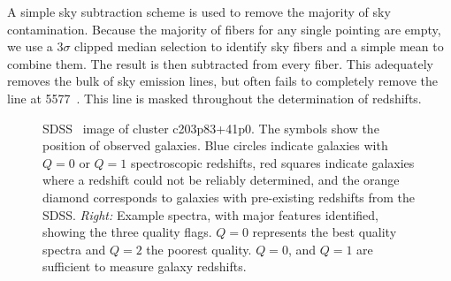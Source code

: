 A simple sky subtraction scheme is used to remove the majority of sky contamination. Because the majority of fibers for any single pointing are empty, we use a $3\sigma$ clipped median selection to identify sky fibers and a simple mean to combine them. The result is then subtracted from every fiber. This adequately removes the bulk of sky emission lines, but often fails to completely remove the \hbox{} line at 5577~\AAA. This line is masked throughout the determination of redshifts.

\begin{figure}[t]
\hfill
{}
    \caption{SDSS \sdssr\ image of cluster c203p83+41p0. The symbols show the position of observed galaxies. Blue circles indicate galaxies with $Q=0$ or $Q=1$ spectroscopic redshifts, red squares indicate galaxies where a redshift could not be reliably determined, and the orange diamond corresponds to galaxies with pre-existing redshifts from the SDSS. \textit{Right:} Example spectra, with major features identified, showing the three quality flags. $Q=0$ represents the best quality spectra and $Q=2$ the poorest quality. $Q=0$, and $Q=1$ are sufficient to measure galaxy redshifts.} 
	\label{2fig:c203p83+41p0}
\end{figure}

